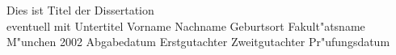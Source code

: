 \munichStyle
{Dies ist Titel der Dissertation\\eventuell mit Untertitel}               %
{Vorname Nachname}                      %
{Geburtsort}                                    %
{Fakult"atsname}                             %
{M"unchen 2002}                            %
{Abgabedatum}                               %
{Erstgutachter}                               %
{Zweitgutachter}                             %
{Pr"ufungsdatum}                             %

